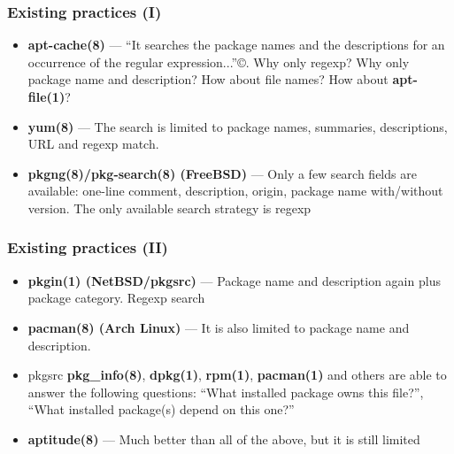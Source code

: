 \documentclass[hyperref=unicode,ascii,xcolor=dvipsnames]{beamer}
\begin{document}

\begin{frame}[fragile]
  \frametitle{Existing practices (I)}
  \begin{itemize}
  \item {\bf apt-cache(8)} --- ``It searches the package names and the
    descriptions for an occurrence of the regular
    expression...''\copyright. Why only regexp? Why only package name
    and description? How about file names? How about {\bf apt-file(1)}?
  \item {\bf yum(8)} --- The search is limited to package names, summaries,
    descriptions, URL and regexp match.
  \item {\bf pkgng(8)/pkg-search(8) (FreeBSD)} --- Only a few search fields
    are available: one-line comment, description, origin, package name
    with/without version. The only available search strategy is regexp
  \end{itemize}
\end{frame}


\begin{frame}[fragile]
  \frametitle{Existing practices (II)}
  \begin{itemize}
  \item {\bf pkgin(1) (NetBSD/pkgsrc)} --- Package name and description again plus package category. Regexp search
  \item {\bf pacman(8) (Arch Linux)} --- It is also limited to package
    name and description.
  \item pkgsrc {\bf pkg\_info(8)}, {\bf dpkg(1)}, {\bf rpm(1)}, {\bf
    pacman(1)} and others are able to answer the following questions:
    ``What installed package owns this file?'', ``What installed
    package(s) depend on this one?''
  \item {\bf aptitude(8)} --- Much better than all of the above, but it is still limited
  \end{itemize}
\end{frame}

\end{document}
